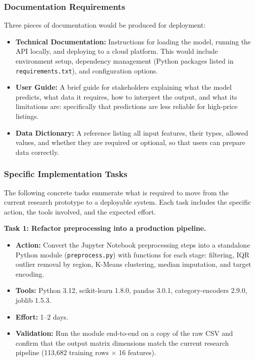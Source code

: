 \subsubsection{Documentation Requirements}

\noindent
Three pieces of documentation would be produced for deployment:

\begin{itemize}
    \item \textbf{Technical Documentation:} Instructions for loading the model, running the API locally, and deploying to a cloud platform. This would include environment setup, dependency management (Python packages listed in \texttt{requirements.txt}), and configuration options.
    \item \textbf{User Guide:} A brief guide for stakeholders explaining what the model predicts, what data it requires, how to interpret the output, and what its limitations are: specifically that predictions are less reliable for high-price listings.
    \item \textbf{Data Dictionary:} A reference listing all input features, their types, allowed values, and whether they are required or optional, so that users can prepare data correctly.
\end{itemize}

\subsubsection{Specific Implementation Tasks}
\label{subsec:Implementation Tasks}

\noindent
The following concrete tasks enumerate what is required to move from the current research prototype to a deployable system. Each task includes the specific action, the tools involved, and the expected effort.

\medskip\noindent
\textbf{Task 1: Refactor preprocessing into a production pipeline.}
\vspace{-9pt}
\begin{itemize}[itemsep=-9pt]
    \item \textbf{Action:} Convert the Jupyter Notebook preprocessing steps into a standalone Python module (\texttt{preprocess.py}) with functions for each stage: filtering, IQR outlier removal by region, K-Means clustering, median imputation, and target encoding.
    \item \textbf{Tools:} Python 3.12, scikit-learn 1.8.0, pandas 3.0.1, category-encoders 2.9.0, joblib 1.5.3.
    \item \textbf{Effort:} 1--2 days.
    \item \textbf{Validation:} Run the module end-to-end on a copy of the raw CSV and confirm that the output matrix dimensions match the current research pipeline (113,682 training rows $\times$ 16 features).
\end{itemize}

